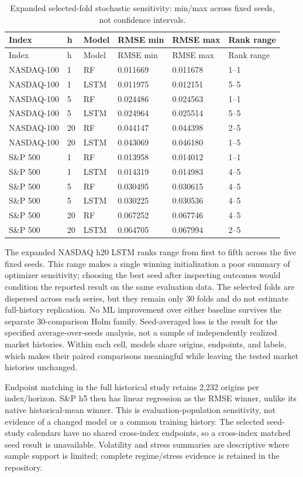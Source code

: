\documentclass[11pt]{article}
\begin{document}
\Needspace{191pt}
{\footnotesize
\begin{longtable}{llllll}
\caption{Expanded selected-fold stochastic sensitivity: min/max across fixed seeds, not confidence intervals.}\\
\toprule
Index & h & Model & RMSE min & RMSE max & Rank range\\
\midrule\endfirsthead
\toprule
Index & h & Model & RMSE min & RMSE max & Rank range\\
\midrule\endhead
NASDAQ-100 & 1 & RF & 0.011669 & 0.011678 & 1--1\\
NASDAQ-100 & 1 & LSTM & 0.011975 & 0.012151 & 5--5\\
NASDAQ-100 & 5 & RF & 0.024486 & 0.024563 & 1--1\\
NASDAQ-100 & 5 & LSTM & 0.024964 & 0.025514 & 5--5\\
NASDAQ-100 & 20 & RF & 0.044147 & 0.044398 & 2--5\\
NASDAQ-100 & 20 & LSTM & 0.043069 & 0.046180 & 1--5\\
S\&P 500 & 1 & RF & 0.013958 & 0.014012 & 1--1\\
S\&P 500 & 1 & LSTM & 0.014319 & 0.014983 & 4--5\\
S\&P 500 & 5 & RF & 0.030495 & 0.030615 & 4--5\\
S\&P 500 & 5 & LSTM & 0.030225 & 0.030536 & 4--5\\
S\&P 500 & 20 & RF & 0.067252 & 0.067746 & 4--5\\
S\&P 500 & 20 & LSTM & 0.064705 & 0.067994 & 2--5\\
\bottomrule\end{longtable}}

The expanded NASDAQ h20 LSTM ranks range from first to fifth across the five fixed seeds. This range makes a single winning initialization a poor summary of optimizer sensitivity; choosing the best seed after inspecting outcomes would condition the reported result on the same evaluation data. The selected folds are dispersed across each series, but they remain only 30 folds and do not estimate full-history replication. No ML improvement over either baseline survives the separate 30-comparison Holm family. Seed-averaged loss is the result for the specified average-over-seeds analysis, not a sample of independently realized market histories. Within each cell, models share origins, endpoints, and labels, which makes their paired comparisons meaningful while leaving the tested market histories unchanged.

Endpoint matching in the full historical study retains 2,232 origins per index/horizon. S\&P h5 then has linear regression as the RMSE winner, unlike its native historical-mean winner. This is evaluation-population sensitivity, not evidence of a changed model or a common training history. The selected seed-study calendars have no shared cross-index endpoints, so a cross-index matched seed result is unavailable. Volatility and stress summaries are descriptive where sample support is limited; complete regime/stress evidence is retained in the repository.
\end{document}
